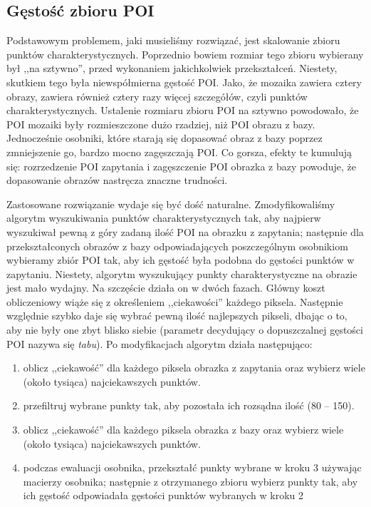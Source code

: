 \documentclass[a4paper,12pt,leqno]{article}
\begin{document}
\subsection{Gęstość zbioru POI}
Podstawowym problemem, jaki musieliśmy rozwiązać, jest skalowanie zbioru punktów charakterystycznych. 
Poprzednio bowiem rozmiar tego zbioru wybierany był ,,na sztywno'', przed wykonaniem jakichkolwiek przekształceń. Niestety, skutkiem tego była niewspółmierna gęstość POI. Jako, że mozaika
zawiera cztery obrazy, zawiera również cztery razy więcej szczegółów, czyli punktów charakterystycznych. Ustalenie rozmiaru zbioru POI na sztywno powodowało, że POI mozaiki
były rozmieszczone dużo rzadziej, niż POI obrazu z bazy. Jednocześnie osobniki, które starają się dopasować obraz z bazy poprzez zmniejszenie go, bardzo mocno zagęszczają POI.
Co gorsza, efekty te kumulują się: rozrzedzenie POI zapytania i zagęszczenie POI obrazka z bazy powoduje, że dopasowanie obrazów nastręcza znaczne trudności.

Zastosowane rozwiązanie wydaje się być dość naturalne. Zmodyfikowaliśmy algorytm wyszukiwania punktów charakterystycznych tak, aby najpierw wyszukiwał pewną z góry zadaną ilość POI na 
obrazku z zapytania; następnie dla przekształconych obrazów z bazy odpowiadających poszczególnym osobnikiom wybieramy zbiór POI tak, aby ich gęstość była podobna do gęstości punktów w 
zapytaniu. Niestety, algorytm wyszukujący punkty charakterystyczne na obrazie jest mało wydajny. Na szczęście działa on w dwóch fazach. Główny koszt obliczeniowy wiąże się z 
określeniem ,,ciekawości'' każdego piksela. Następnie względnie szybko daje się wybrać pewną ilość najlepszych pikseli, dbając o to, aby nie były one zbyt blisko siebie (parametr decydujący o
dopuszczalnej gęstości POI nazywa się \textit{tabu}). Po modyfikacjach algorytm działa następująco:
\begin{enumerate}
 \item oblicz ,,ciekawość'' dla każdego piksela obrazka z zapytania oraz wybierz wiele (około tysiąca) najciekawszych punktów.
 \item przefiltruj wybrane punkty tak, aby pozostała ich rozsądna ilość (80 -- 150).
 \item oblicz ,,ciekawość'' dla każdego piksela obrazka z bazy oraz wybierz wiele (około tysiąca) najciekawszych punktów.
 \item podczas ewaluacji osobnika, przekształć punkty wybrane w kroku 3 używając macierzy osobnika;
       następnie z otrzymanego zbioru wybierz punkty tak, aby ich gęstość odpowiadała gęstości punktów wybranych w kroku 2
\end{enumerate}
\end{document}
